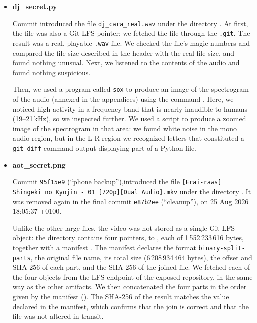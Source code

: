 \documentclass[11pt,a4paper,final,oneside]{article}
\begin{document}
\begin{itemize}
  \item \textbf{dj\_secret.py}

  Commit  introduced the file \texttt{dj\_cara\_real.wav} under the directory . 
  At first, the file was also a Git LFS pointer; we fetched the file through the \texttt{.git}.
  The result was a real, playable \texttt{.wav} file. We checked the file's magic numbers and compared the file size described in the header with the real file size, and found nothing unusual. Next, we listened to the contents of the audio and found nothing suspicious.

  Then, we used a program called \texttt{sox} to produce an image of the spectrogram of the audio (annexed in the appendices) using the command . Here, we noticed high activity in a frequency band that is nearly inaudible to humans (19--21\,kHz), so we inspected further. We used a script to produce a zoomed image of the spectrogram in that area: we found white noise in the mono audio region, but in the L-R region we recognized letters that constituted a \texttt{git diff} command output displaying part of a Python file.

  \item \textbf{aot\_secret.png}

  Commit \texttt{95f15e9} (``phone backup''),introduced the file \texttt{{[}Erai-raws{]} Shingeki no Kyojin - 01 {[}720p{]}{[}Dual Audio{]}.mkv} under the directory . It was removed again in the final commit \texttt{e87b2ee} (``cleanup''), on 25 Aug 2026 18:05:37 +0100.

  Unlike the other large files, the video was not stored as a single Git LFS object: the directory contains four pointers,  to , each of 1\,552\,233\,616 bytes, together with a manifest . The manifest declares the format \texttt{binary-split-parts}, the original file name, its total size (6\,208\,934\,464 bytes), the offset and SHA-256 of each part, and the SHA-256 of the joined file. We fetched each of the four objects from the LFS endpoint of the exposed repository, in the same way as the other artifacts. We then concatenated the four parts in the order given by the manifest (). The SHA-256 of the result matches the value declared in the manifest, which confirms that the join is correct and that the file was not altered in transit.


\end{itemize}
\end{document}
